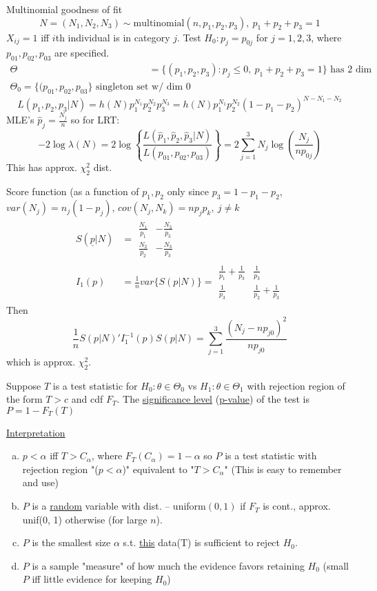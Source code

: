 \documentclass[english, 11pt]{article}
\newcommand{\lp}{\left(}
\newcommand{\rp}{\right)}
\begin{document}
\begin{exmp}\label{exmp:534}
Multinomial goodness of fit
$$
N=(N_1, N_2, N_3)\sim\text{multinomial}(n, p_1, p_2, p_3), ~p_1+p_2+p_3=1
$$
$X_{ij}=1$ iff $i$th individual is in category $j$. Test $H_0:p_j=p_{0j}$ for $j=1, 2, 3$, where $p_{01}, p_{02}, p_{03}$ are specified.
$$
\begin{aligned}
\Theta&=\{(p_1, p_2, p_3):p_j\leqslant0, ~p_1+p_2+p_3=1\}\text{ has 2 dim}\\
\Theta_0=\{(p_{01}, p_{02}, p_{03}\}\text{ singleton set w/ dim 0}
\end{aligned}
$$
$$
L(p_1, p_2, p_3|N)=h(N)p_1^{N_1}p_2^{N_2}p_3^{N_3}=h(N)p_1^{N_1}p_2^{N_2}(1-p_1-p_2)^{N-N_1-N_2}
$$
MLE's $\hat{p}_j=\frac{N_j}{n}$
so for LRT:
$$
-2\log\lambda(N)=2\log\left\{\frac{L(\hat{p}_1, \hat{p}_2, \hat{p}_3|N)}{L(p_{01}, p_{02}, p_{03})}\right\}=2\sum_{j=1}^3N_j\log\lp\frac{N_j}{np_{0j}}\rp
$$
This has approx. $\chi^2_2$ dist.

Score function (as a function of $p_1, p_2$ only since $p_3=1-p_1-p_2$, $var(N_j)=n_j(1-p_j)$, $cov(N_j, N_k)=np_jp_k, \ j\not=k$
$$
\begin{aligned}
S(\underline{p}|N)&=\begin{matrix}
\frac{N_1}{p_1} & -\frac{N_3}{p_3}\\
\frac{N_2}{p_2} & -\frac{N_3}{p_3}
\end{matrix}\\
I_1(p)&=\frac{1}{n}var\{S(p|N)\}=\begin{matrix}
\frac{1}{p_1}+\frac{1}{p_3} &\frac{1}{p_3}\\
\frac{1}{p_3} &\frac{1}{p_2}+\frac{1}{p_3}
\end{matrix}
\end{aligned}
$$
Then 
$$
\frac{1}{n}S(p|N)'I_1^{-1}(p)S(p|N)=\sum_{j=1}^3\frac{(N_j-np_{j0})^2}{np_{j0}}
$$
which is approx. $\chi^2_2$.
\end{exmp}

\begin{defn}\label{defn:535}
Suppose $T$ is a test statistic for $H_0:\theta\in\Theta_0$ vs $H_1:\theta\in\Theta_1$ with rejection region of the form $T>c$ and cdf $F_T$. The \underline{significance level} (\underline{p-value}) of the test is $P=1-F_T(T)$
\end{defn}

\vspace{5 mm}

\underline{Interpretation}
\begin{enumerate}[a)]
\item $p<\alpha$ iff $T>C_\alpha$, where $F_T(C_\alpha)=1-\alpha$ so $P$ is a test statistic with rejection region "($p<\alpha$)" equivalent to "$T>C_\alpha$" (This is easy to remember and use)
\item $P$ is a \underline{random} variable with dist. -- uniform$(0, 1)$ if $F_T$ is cont., approx. unif(0, 1) otherwise (for large $n$).
\item $P$ is the smallest size $\alpha$ s.t. \underline{this} data(T) is sufficient to reject $H_0$.
\item $P$ is a sample "measure" of how much the evidence favors retaining $H_0$ (small $P$ iff little evidence for keeping $H_0$)
\end{enumerate}
\end{document}
